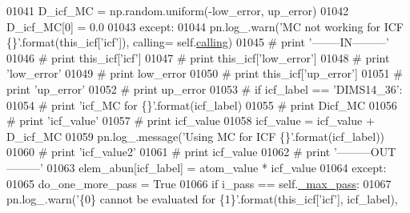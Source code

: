 \begin{DoxyCode}
{{{01041                                     D\_icf\_MC = np.random.uniform(-low\_error, up\_error)
01042                                 D\_icf\_MC[0] = 0.0
01043                             \textcolor{keywordflow}{except}:
01044                                 pn.log\_.warn(\textcolor{stringliteral}{'MC not working for ICF \{\}'}.format(this\_icf[\textcolor{stringliteral}{'icf'}]), calling=
      self.\hyperlink{classpyneb_1_1core_1_1icf_1_1_i_c_f_aaeb9b3827ef557a32b109baef31da77f}{calling})
01045 \textcolor{comment}{#                             print '--------IN---------'}
01046 \textcolor{comment}{#                             print this\_icf['icf']}
01047 \textcolor{comment}{#                             print this\_icf['low\_error']}
01048 \textcolor{comment}{#                             print 'low\_error'}
01049 \textcolor{comment}{#                             print low\_error}
01050 \textcolor{comment}{#                             print this\_icf['up\_error']}
01051 \textcolor{comment}{#                             print 'up\_error'}
01052 \textcolor{comment}{#                             print up\_error}
01053 \textcolor{comment}{#                             if icf\_label == 'DIMS14\_36':}
01054 \textcolor{comment}{#                                 print 'icf\_MC for \{\}'.format(icf\_label)}
01055 \textcolor{comment}{#                                 print Dicf\_MC}
01056 \textcolor{comment}{#                                 print 'icf\_value'                            }
01057 \textcolor{comment}{#                                 print icf\_value}
01058                             icf\_value = icf\_value + D\_icf\_MC
01059                             pn.log\_.message(\textcolor{stringliteral}{'Using MC for ICF \{\}'}.format(icf\_label))
01060 \textcolor{comment}{#                             print 'icf\_value2'                            }
01061 \textcolor{comment}{#                             print icf\_value}
01062 \textcolor{comment}{#                             print '---------OUT---------'}
01063                         elem\_abun[icf\_label] = atom\_value * icf\_value
01064                     \textcolor{keywordflow}{except}:
01065                         do\_one\_more\_pass = \textcolor{keyword}{True}
01066                         \textcolor{keywordflow}{if} i\_pass == self.\hyperlink{classpyneb_1_1core_1_1icf_1_1_i_c_f_a994574a4b1fff9d0700fb483dabc8238}{\_max\_pass}:
01067                             pn.log\_.warn(\textcolor{stringliteral}{'\{0\} cannot be evaluated for \{1\}'}.format(this\_icf[\textcolor{stringliteral}{'icf'}], 
      icf\_label),
}}}
\end{DoxyCode}
